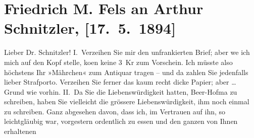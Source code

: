

         
         \renewcommand{\erwaehntePersonen}{Personen:  ?? [Vermieterin von F. M. Fels], Richard Beer-Hofmann, Friedrich Michael Fels}
         \renewcommand{\erwaehnteInstitutionen}{Institutionen: Augartenfest}
         \renewcommand{\erwaehnteOrte}{Orte: Krütznergasse, Wien}
         \renewcommand{\erwaehnteWerke}{Werke: Das Märchen. Schauspiel in drei Aufzügen}
               \section[Friedrich M. Fels an Arthur Schnitzler, {[}17. 5. 1894{]}]{ Friedrich M. Fels an Arthur Schnitzler, {[}17. 5. 1894{]}}\nopagebreak{}\rehead{ }\begin{ledgroupsized}[t]{13cm}\normalsize\beginnumbering{} \toendnotes[C]{\smallbreak\pagebreak[2]} 
\toendnotes[C]{\smallbreak}\pstart{}{\pb}Lieber Dr. Schnitzler!\pend\pstart
           I. Verzeihen Sie mir den unfrankierten Brief; aber we{\geminationn}
               ich mich auf den Kopf stelle, ko{\geminationm}en keine 3 Kr zum
               Vorschein. Ich müsste also höchstens Ihr »Mährchen« zum Antiquar tragen – und da zahlen Sie jedenfalls lieber
               Strafporto. Verzeihen Sie ferner das kaum recht dicke Papier; aber {\dots} Grund wie vorhin.\pend
           \pstart
           II. Da Sie die Liebenswürdigkeit hatten, Beer-Hofma{\geminationn} zu schreiben, haben Sie vielleicht die grössere Liebenswürdigkeit, ihm noch
               einmal zu schreiben. Ganz abgesehen davon, dass ich, im Vertrauen auf ihn, so
               leichtgläubig war, vorgestern ordentlich zu essen und den ganzen von Ihnen erhaltenen

\end{ledgroupsized}
